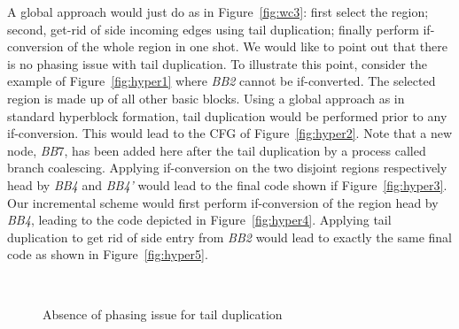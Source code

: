 A global approach would just do as in Figure~\ref{fig:wc3}: first select the region; second, get-rid of side incoming edges using tail duplication; finally perform if-conversion of the whole region in one shot. We would like to point out that there is no phasing issue with tail duplication. To illustrate this point, consider the example of Figure~\ref{fig:hyper1} where \textit{BB2} cannot be if-converted. The selected region is made up of all other basic blocks. Using a global approach as in standard hyperblock formation, tail duplication would be performed prior to any if-conversion. This would lead to the CFG of Figure~\ref{fig:hyper2}. Note that a new node, \textit{BB}7, has been added here after the tail duplication by a process called branch coalescing. Applying if-conversion on the two disjoint regions respectively head by \textit{BB4} and \textit{BB4'} would lead to the final code shown if Figure~\ref{fig:hyper3}. Our incremental scheme would first perform if-conversion of the region head by \textit{BB4}, leading to the code depicted in Figure~\ref{fig:hyper4}. Applying tail duplication to get rid of side entry from \textit{BB2} would lead to exactly the same final code as shown in Figure~\ref{fig:hyper5}.

\begin{figure}[h]
  \hfill
  \hfill
  \\
  \hfill
  \hfill
 \caption{Absence of phasing issue for tail duplication\label{fig:hyper}}
\end{figure}


